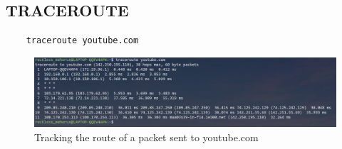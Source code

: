 \documentclass[11pt]{article}
\begin{document}
\subsection{TRACEROUTE}
\begin{verbatim}
	traceroute youtube.com
\end{verbatim}
\begin{figure}[H]
\centering
\includegraphics[width=\textwidth]{res/traceroute 1.png}
\caption{Tracking the route of a packet sent to youtube.com}
\end{figure}
\end{document}
